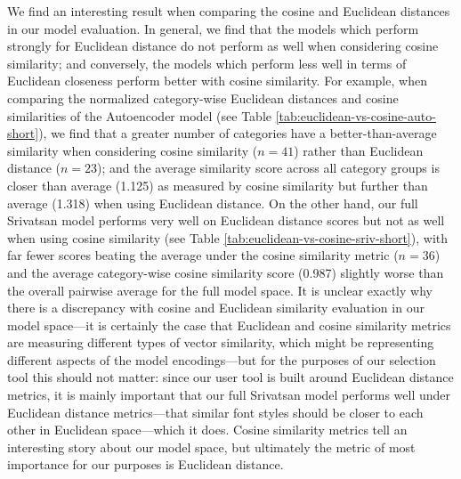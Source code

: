 We find an interesting result when comparing the cosine and Euclidean distances in our model evaluation. In general, we find that the models which perform strongly for Euclidean distance do not perform as well when considering cosine similarity; and conversely, the models which perform less well in terms of Euclidean closeness perform better with cosine similarity. For example, when comparing the normalized category-wise Euclidean distances and cosine similarities of the Autoencoder model (see Table \ref{tab:euclidean-vs-cosine-auto-short}), we find that a greater number of categories have a better-than-average similarity when considering cosine similarity ($n=41$) rather than Euclidean distance ($n=23$); and the average similarity score across all category groups is closer than average (1.125) as measured by cosine similarity but further than average (1.318) when using Euclidean distance. On the other hand, our full Srivatsan model performs very well on Euclidean distance scores but not as well when using cosine similarity (see Table \ref{tab:euclidean-vs-cosine-sriv-short}), with far fewer scores beating the average under the cosine similarity metric ($n=36$) and the average category-wise cosine similarity score (0.987) slightly worse than the overall pairwise average for the full model space. It is unclear exactly why there is a discrepancy with cosine and Euclidean similarity evaluation in our model space---it is certainly the case that Euclidean and cosine similarity metrics are measuring different types of vector similarity, which might be representing different aspects of the model encodings---but for the purposes of our selection tool this should not matter: since our user tool is built around Euclidean distance metrics, it is mainly important that our full Srivatsan model performs well under Euclidean distance metrics---that similar font styles should be closer to each other in Euclidean space---which it does. Cosine similarity metrics tell an interesting story about our model space, but ultimately the metric of most importance for our purposes is Euclidean distance.

